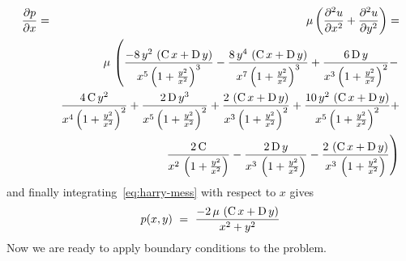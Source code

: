 \documentclass[12pt,twoside]{article}
\begin{document}
\begin{eqnarray}
\frac{\partial p}{\partial x} & = &\mu \left ( \frac{\partial^2 u}{\partial x^2}
+ \frac{\partial^2 u}{\partial y^2} \right ) =  \nonumber \\
&& \mu \,\left( {{-8\,{y^2}\,
        \left( {\rm C}\,x + {\rm D}\,y \right) }\over 
      {{x^5}\,{{\left( 1 + {{{y^2}}\over {{x^2}}} \right) }^
          3}}} - {{8\,{y^4}\,
        \left( {\rm C}\,x + {\rm D}\,y \right) }\over 
      {{x^7}\,{{\left( 1 + {{{y^2}}\over {{x^2}}} \right) }^
          3}}} + {{6\,{\rm D}\,y}\over 
      {{x^3}\,{{\left( 1 + {{{y^2}}\over {{x^2}}} \right) }^
          2}}} - \right. \nonumber \\
 &&   {{4\,{\rm C}\,{y^2}}\over 
      {{x^4}\,{{\left( 1 + {{{y^2}}\over {{x^2}}} \right) }^
          2}}} + {{2\,{\rm D}\,{y^3}}\over 
      {{x^5}\,{{\left( 1 + {{{y^2}}\over {{x^2}}} \right) }^
          2}}} + {{2\,\left( {\rm C}\,x + {\rm D}\,y \right )
        }\over 
      {{x^3}\,{{\left( 1 + {{{y^2}}\over {{x^2}}} \right ) }^
          2}}} + {{10\,{y^2}\,
        \left( {\rm C}\,x + {\rm D}\,y \right) }\over 
      {{x^5}\,{{\left( 1 + {{{y^2}}\over {{x^2}}} \right) }^
          2}}} +  \nonumber \\
 &&   \left. {{2\,{\rm C}}\over 
      {{x^2}\,\left( 1 + {{{y^2}}\over {{x^2}}} \right) }} -
      {{2\,{\rm D}\,y}\over 
      {{x^3}\,\left( 1 + {{{y^2}}\over {{x^2}}} \right) }} -
      {{2\,\left( {\rm C}\,x + {\rm D}\,y \right) }\over 
      {{x^3}\,\left( 1 + {{{y^2}}\over {{x^2}}} \right) }} \right )
\label{eq:harry-mess}
\end{eqnarray}
and finally integrating~\ref{eq:harry-mess} with respect to $x$ gives
\begin{equation}
p(x,y) ~=~ {{-2\,\mu \,\left( {\rm C}\,x + {\rm D}\,y \right) }\over 
   {{x^2} + {y^2}}}
\end{equation}
Now we are ready to apply boundary conditions to the problem.
\end{document}
